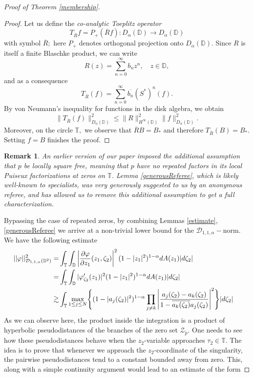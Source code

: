 \documentclass[11pt]{amsart}
\newtheorem{remark}[theorem]{Remark}
\numberwithin{equation}{section}
\begin{document}
\begin{proof}[Proof of Theorem \ref{membership}]
\begin{proof}
Let us define the \textit{co-analytic Toeplitz operator} $$T_{\overline{R}}f=P_{+}(\overline{R}f)\colon D_{\alpha}(\mathbb{D})\to D_{\alpha}(\mathbb{D})$$
with symbol $\overline{R};$ here $P_{+}$ denotes orthogonal projection onto $D_{\alpha}(\mathbb{D})$.
Since $R$ is itself a finite Blaschke product, we can write $$R(z)=\sum_{n=0}^{\infty}b_{n}z^n, \quad z\in \mathbb{D},$$ and as a consequence
$$T_{\overline{R}}(f)=\sum_{n=0}^{\infty}\overline{b_n}(S^*)^n(f).$$ By von Neumann's inequality for functions in the disk algebra, we obtain
$$\|T_{\overline{R}}(f)\|^2_{D_{\alpha}(\mathbb{D})}\leq \|R\|_{H^{\infty}(\mathbb{D})}^2\|f\|_{D_{\alpha}(\mathbb{D})}^2.$$
Moreover, on the circle $\mathbb{T},$ we observe that $\overline{R}B=B_{*}$ and therefore
$T_{\overline{R}}(B)=B_{*}.$ Setting $f=B$ finishes the proof.
\end{proof} 
\begin{remark}
An earlier version of our paper imposed the additional assumption that $p$ be locally square free, meaning that $p$ have no repeated factors in its local Puiseux factorizations at zeros on $\mathbb{T}$. Lemma \ref{generousReferee}, which is likely well-known to specialists, was very generously suggested to us by an anonymous referee, and has allowed us to remove this additional assumption to get a full characterization.  
\end{remark}
Bypassing the case of repeated zeros, by combining Lemmas \ref{estimate}, \ref{generousReferee} we arrive at a non-trivial lower bound for the $\mathcal{D}_{1,1,\alpha}-$norm. We have the following estimate
\begin{align}
||\varphi||^2_{\mathcal{D}_{1,1,\alpha}(\mathbb{D}^2)}=&\int_{\mathbb{T}}\int_{\mathbb{D}}\left|\frac{\partial \varphi}{\partial z_1}(z_1,\zeta_2)\right|^2(1-|z_1|^2)^{1-\alpha}dA(z_1)|d\zeta_2|\notag&&\\
=&\int_{\mathbb{T}}\int_{\mathbb{D}}|\varphi'_{\zeta_2}(z_1)|^2(1-|z_1|^2)^{1-\alpha}dA(z_1)|d\zeta_2|&&\\
\gtrsim& \int_{\mathbb{T}}\max_{1\leq j\leq N}\Biggl\{(1-|a_j(\zeta_2)|^2)^{1-\alpha}\prod_{j\neq k}\left|\frac{a_{j}(\zeta_2)-a_{k}(\zeta_2)}{1-\overline{a_{k}(\zeta_2)}a_{j}(\zeta_2)}\right|^2\Biggr\}|d\zeta_2| \notag
\end{align}
As we can observe here, the product inside the integration is a product of hyperbolic pseudodistances of the branches of the zero set $\mathcal{Z}_{\widetilde{p}}.$ One needs to see how these  pseudodistances behave when the $z_2$-variable approaches $\tau_2\in\mathbb{T}.$ The idea is to prove that whenever we approach the $z_2$-coordinate of the singularity, the pairwise pseudodistances tend to a constant bounded away from zero. This, along with a simple continuity argument would lead to an estimate of the form

\end{proof}
\end{document}

